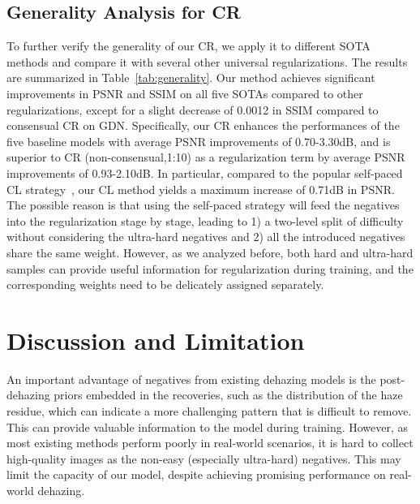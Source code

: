 \subsection{Generality Analysis for CR}
\vspace{-2mm}To further verify the generality of our CR, we apply it to different SOTA methods and compare it with several other universal regularizations. The results are summarized in Table~\ref{tab:generality}. Our method achieves significant improvements in PSNR and SSIM on all five SOTAs compared to other regularizations, except for a slight decrease of 0.0012 in SSIM compared to consensual CR on GDN. Specifically, our CR enhances the performances of the five baseline models with average PSNR improvements of 0.70-3.30dB, and is superior to CR (non-consensual,1:10) as a regularization term by average PSNR improvements of 0.93-2.10dB. In particular, compared to the popular self-paced CL strategy~\cite{Kumar2010}, our CL method yields a maximum increase of 0.71dB in PSNR. The possible reason is that using the self-paced strategy will feed the negatives into the regularization stage by stage, leading to 1) a two-level split of difficulty without considering the ultra-hard negatives and 2) all the introduced negatives share the same weight. However, as we analyzed before, both hard and ultra-hard samples can provide useful information for regularization during training, and the corresponding weights need to be delicately assigned separately.

\vspace{-2mm}\section{Discussion and Limitation}\vspace{-2mm}
An important advantage of negatives from existing dehazing models is the post-dehazing priors embedded in the recoveries, such as the distribution of the haze residue, which can indicate a more challenging pattern that is difficult to remove. This can provide valuable information to the model during training. However, as most existing methods perform poorly in real-world scenarios, it is hard to collect high-quality images as the non-easy (especially ultra-hard) negatives. This may limit the capacity of our model, despite achieving promising performance on real-world dehazing.



















